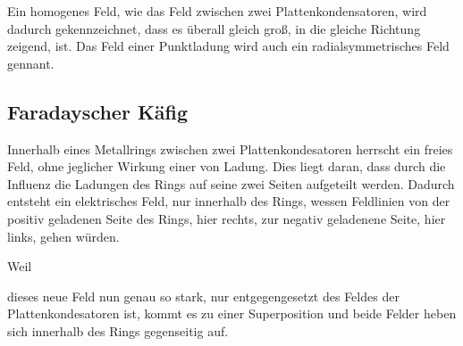 \documentclass{article}
\begin{document}
Ein homogenes Feld, wie das Feld zwischen zwei Plattenkondensatoren, wird dadurch gekennzeichnet, dass es überall gleich groß, in die gleiche Richtung zeigend, ist. \newline
Das Feld einer Punktladung wird auch ein radialsymmetrisches Feld gennant. 
 
\subsection{Faradayscher Käfig}
\begin{minipage}{\dimexpr\linewidth-5cm} 
 Innerhalb eines Metallrings zwischen zwei Plattenkondesatoren herrscht ein freies Feld, ohne jeglicher Wirkung einer von Ladung. Dies liegt daran, dass durch die Influenz die Ladungen des Rings auf seine zwei Seiten aufgeteilt werden. Dadurch entsteht ein elektrisches Feld, nur innerhalb des Rings, wessen Feldlinien von der positiv geladenen Seite des Rings, hier rechts, zur negativ geladenene Seite, hier links, gehen würden. {Weil\parfillskip=0pt\par} \vspace{0.1em}
\end{minipage} 
\hfill
\begin{minipage}{5cm}
 \center 
\end{minipage}
 
\noindent dieses neue Feld nun genau so stark, nur entgegengesetzt des Feldes der Plattenkondesatoren ist, kommt es zu einer Superposition und beide Felder heben sich innerhalb des Rings gegenseitig auf. 
 
\end{document}
